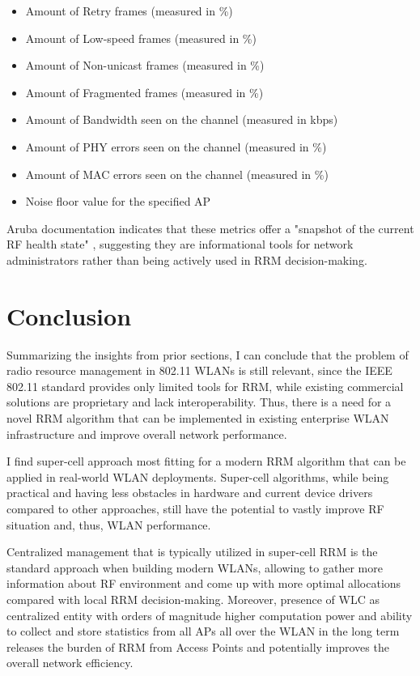 \begin{itemize}
    \item Amount of Retry frames (measured in \%)
    \item Amount of Low-speed frames (measured in \%)
    \item Amount of Non-unicast frames (measured in \%)
    \item Amount of Fragmented frames (measured in \%)
    \item Amount of Bandwidth seen on the channel (measured in kbps)
    \item Amount of PHY errors seen on the channel (measured in \%)
    \item Amount of MAC errors seen on the channel (measured in \%)
    \item Noise floor value for the specified AP
\end{itemize}

Aruba documentation indicates that these metrics offer a "snapshot of the current RF health state" \cite{ARMMetrics}, suggesting they are informational tools for network administrators rather than being actively used in RRM decision-making.

\section {Conclusion}
\label{chap:lr:sec:conclusion}
Summarizing the insights from prior sections, I can conclude that the problem of radio resource management in 802.11 WLANs is still relevant, since the IEEE 802.11 standard provides only limited tools for RRM, while existing commercial solutions are proprietary and lack interoperability. Thus, there is a need for a novel RRM algorithm that can be implemented in existing enterprise WLAN infrastructure and improve overall network performance.

I find super-cell approach most fitting for a modern RRM algorithm that can be applied in real-world WLAN deployments. Super-cell algorithms, while being practical and having less obstacles in hardware and current device drivers compared to other approaches, still have the potential to vastly improve RF situation and, thus, WLAN performance.

Centralized management that is typically utilized in super-cell RRM is the standard approach when building modern WLANs, allowing to gather more information about RF environment and come up with more optimal allocations compared with local RRM decision-making.
Moreover, presence of WLC as centralized entity with orders of magnitude higher computation power and ability to collect and store statistics from all APs all over the WLAN in the long term releases the burden of RRM from Access Points and potentially improves the overall network efficiency.

